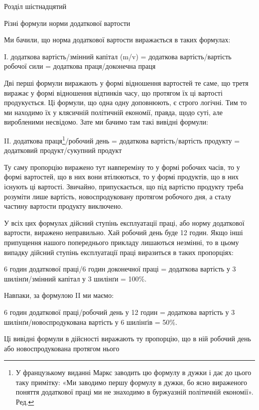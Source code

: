 Розділ шістнадцятий

Різні формули норми додаткової вартости

Ми бачили, що норма додаткової вартости виражається в таких
формулах:

I. додаткова вартість/змінний капітал (m/v) =
додаткова вартість/вартість робочої сили =
додаткова праця/доконечна праця

Дві перші формули виражають у формі відношення вартостей
те саме, що третя виражає у формі відношення відтинків часу,
що протягом їх ці вартості продукується. Ці формули, що одна
одну доповнюють, є строго логічні. Тим то ми находимо їх у клясичній
політичній економії, правда, щодо суті, але виробленими
несвідомо. Зате ми бачимо там такі вивідні формули:

II. додаткова праця\footnote*{
У французькому виданні Маркс заводить цю формулу в дужки
і дає до цього таку примітку: «Ми заводимо першу формулу в дужки,
бо ясно вираженого поняття додаткової праці ми не знаходимо в буржуазній
політичній економії». Ред.
}/робочий день =
додаткова вартість/вартість продукту =
додатковий продукт/сукупний продукт

Ту саму пропорцію виражено тут навпереміну то у формі
робочих часів, то у формі вартостей, що в них вони втілюються,
то у формі продуктів, що в них існують ці вартості. Звичайно,
припускається, що під вартістю продукту треба розуміти лише
вартість, новоспродуковану протягом робочого дня, а сталу частину
вартости продукту виключено.

У всіх цих формулах дійсний ступінь експлуатації праці, або
норму додаткової вартости, виражено неправильно. Хай робочий
день буде 12 годин. Якщо інші припущення нашого попереднього
прикладу лишаються незмінні, то в цьому випадку дійсний
ступінь експлуатації праці виразиться в таких пропорціях:

6    годин додаткової праці/6 годин доконечної праці =
додаткова вартість у 3 шилінґи/змінний капітал у 3 шилінґи = 100\%.

Навпаки, за формулою II ми маємо:

6 годин додаткової праці/робочий день у 12 годин =
додаткова вартість у 3 шилінґи/новоспродукована вартість у 6 шилінґів =
50\%.

Ці вивідні формули в дійсності виражають ту пропорцію,
що в ній робочий день або новоспродукована протягом нього
\parbreak{}  %
